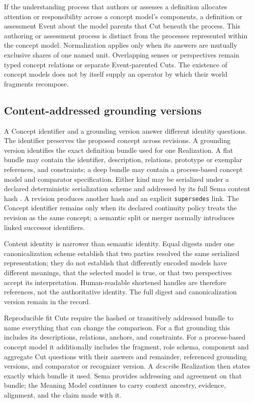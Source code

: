 \documentclass[11pt,a4paper]{article}
\begin{document}
If the understanding process that authors or assesses a definition allocates
attention or responsibility across a concept model's components, a definition
or assessment Event about the model parents that Cut beneath the process.
This authoring or assessment process is distinct from the processes represented
within the concept model. Normalization applies only when its answers are mutually
exclusive shares of one named unit. Overlapping senses or perspectives remain
typed concept relations or separate Event-parented Cuts. The existence of
concept models does not by itself supply an operator by which their world
fragments recompose.

\subsection{Content-addressed grounding versions}
\label{sec:grounding-versions}

A Concept identifier and a grounding version answer different identity
questions. The identifier preserves the proposed concept across revisions. A
grounding version identifies the exact definition bundle used for one
Realization. A flat bundle may contain the identifier, description, relations,
prototype or exemplar references, and constraints; a deep bundle may contain a
process-based concept model and comparator specification. Either kind may be serialized
under a declared deterministic serialization scheme and addressed by its full Sema content hash
\cite{westerbergSema2026}. A revision produces another hash and an explicit
\texttt{supersedes} link. The Concept identifier remains only when its declared
continuity policy treats the revision as the same concept; a semantic split or
merger normally introduces linked successor identifiers.

Content identity is narrower than semantic identity. Equal digests under one
canonicalization scheme establish that two parties resolved the same serialized
representation;
they do not establish that differently encoded models have different meanings,
that the selected model is true, or that two perspectives accept its interpretation.
Human-readable shortened handles are therefore references, not the
authoritative identity. The full digest and canonicalization version remain in
the record.

Reproducible fit Cuts require the hashed or transitively addressed bundle to
name everything that can change the comparison. For a flat grounding this
includes its descriptions, relations, anchors, and constraints. For a process-based
concept model it additionally includes the fragment, role schema, component and
aggregate Cut questions with their answers and remainder, referenced grounding
versions, and comparator or recognizer version. A \emph{describe} Realization
then states exactly which bundle it used. Sema
provides addressing and agreement on that bundle; the Meaning Model continues
to carry context ancestry, evidence, alignment, and the claim made with it.
\end{document}
